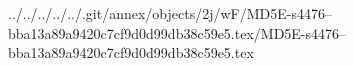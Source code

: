 ../../../../../.git/annex/objects/2j/wF/MD5E-s4476--bba13a89a9420c7cf9d0d99db38c59e5.tex/MD5E-s4476--bba13a89a9420c7cf9d0d99db38c59e5.tex